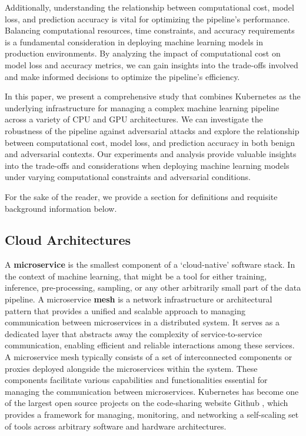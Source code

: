 \documentclass[conference]{IEEEtran}
\begin{document}
Additionally, understanding the relationship between computational cost, model loss, and prediction accuracy is vital for optimizing the pipeline's performance. Balancing computational resources, time constraints, and accuracy requirements is a fundamental consideration in deploying machine learning models in production environments. By analyzing the impact of computational cost on model loss and accuracy metrics, we can gain insights into the trade-offs involved and make informed decisions to optimize the pipeline's efficiency.

In this paper, we present a comprehensive study that combines Kubernetes as the underlying infrastructure for managing a complex machine learning pipeline across a variety of CPU and GPU architectures. We can investigate the robustness of the pipeline against adversarial attacks and explore the relationship between computational cost, model loss, and  prediction accuracy in both benign and adversarial contexts. Our experiments and analysis provide valuable insights into the trade-offs and considerations when deploying machine learning models under varying computational constraints and adversarial conditions.


For the sake of the reader, we provide a section for definitions and requisite background information below.

\subsection{Cloud Architectures}
A \textbf{microservice} is the smallest component of a `cloud-native' software stack. In the context of machine learning, that might be a tool for either training, inference, pre-processing, sampling, or any other arbitrarily small part of the data pipeline. A microservice \textbf{mesh} is a network infrastructure or architectural pattern that provides a unified and scalable approach to managing communication between microservices in a distributed system. It serves as a dedicated layer that abstracts away the complexity of service-to-service communication, enabling efficient and reliable interactions among these services. A microservice mesh typically consists of a set of interconnected components or proxies deployed alongside the microservices within the system. These components facilitate various capabilities and functionalities essential for managing the communication between microservices. Kubernetes has become one of the largest open source projects on the code-sharing website Github \cite{k8s-size}, which provides a framework for managing, monitoring, and networking a self-scaling set of tools across arbitrary software and hardware architectures.
\end{document}
